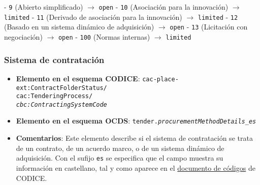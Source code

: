 \begin{itemize}
                        \subitem - \texttt{9} (Abierto simplificado) $\rightarrow$ \texttt{open}
                        \subitem - \texttt{10} (Asociación para la innovación) $\rightarrow$ \texttt{limited}
                        \subitem - \texttt{11} (Derivado de asociación para la innovación) $\rightarrow$ \texttt{limited}
                        \subitem - \texttt{12} (Basado en un sistema dinámico de adquisición) $\rightarrow$ \texttt{open}
                        \subitem - \texttt{13} (Licitación con negociación) $\rightarrow$ \texttt{open}
                        \subitem - \texttt{100} (Normas internas) $\rightarrow$ \texttt{limited}
            \end{itemize}
        
        \subsubsection{Sistema de contratación} \label{subsec:SistemaDeContratacion}
            \begin{itemize}
                \item \textbf{Elemento en el esquema CODICE}:
                    \tabto{7.6cm} \texttt{cac-place-ext:ContractFolderStatus/} \\
                    \tabto{7.6cm} \texttt{cac:TenderingProcess/} \\
                    \tabto{7.6cm} \texttt{\textit{cbc:ContractingSystemCode}}
                \item \textbf{Elemento en el esquema OCDS}:
                    \tabto{7.6cm} \texttt{tender.\textit{procurementMethodDetails\_es}}
                \item \textbf{Comentarios}: Este elemento describe si el sistema de contratación se trata de un contrato, de un acuerdo marco, o de un sistema dinámico de adquisición. Con el sufijo \texttt{es} se especifica que el campo muestra su información en castellano, tal y como aparece en el \href{https://contrataciondelestado.es/codice/cl/2.08/ContractingSystemTypeCode-2.08.gc}{documento de códigos} de CODICE.
            \end{itemize}
        
